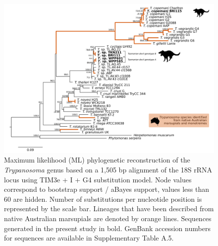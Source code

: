 \documentclass[a4paper, nobind]{templates/ociamthesis}
\begin{document}
\begin{figure}
\includegraphics[width=0.95\linewidth]{figures/ms-figs/Ch6-Fig2} \caption[Phylogenetic tree (\textit{18S rRNA}) of \textit{Trypanosoma} spp. from the Tasmanian devil.]{Maximum likelihood (ML) phylogenetic reconstruction of the \textit{Trypanosoma} genus based on a 1,505 bp alignment of the 18S rRNA locus using TIM3e + I + G4 substitution model. Node values correspond to bootstrap support / aBayes support, values less than 60 are hidden. Number of substitutions per nucleotide position is represented by the scale bar. Lineages that have been described from native Australian marsupials are denoted by orange lines. Sequences generated in the present study in bold. GenBank accession numbers for sequences are available in Supplementary Table A.5.}\label{fig:F62}
\end{figure}
\end{document}
